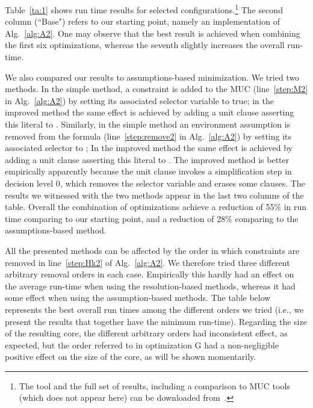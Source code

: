 \documentclass[twoside,11pt]{article}
\begin{document}
Table~\ref{ta:1} shows run time results for selected
configurations.\footnote{The tool and the full set of results, including a
comparison to MUC tools (which does not appear here) can be downloaded
from~\cite{RS11-URL}.} The second column (``Base") refers to our starting
point, namely an implementation of Alg.~\ref{alg:A2}. One may observe that the best result is achieved when combining the first six optimizations, whereas the seventh slightly increases the overall run-time.



We also compared our results to assumptions-based minimization. We tried two methods. In the simple
method, a constraint is added to the MUC (line~\ref{step:M2} in
Alg.~\ref{alg:A2}) by setting its associated selector variable to true; in
the improved method the same effect is achieved by adding a unit clause
asserting this literal to \true. Similarly, in the simple method an
environment assumption is removed from the formula (line~\ref{step:remove2}
in Alg.~\ref{alg:A2}) by setting its associated selector to \false; In the
improved method the same effect is achieved by adding a unit clause asserting
this literal to \false. The improved method is better empirically apparently
because the unit clause invokes a simplification step in decision level 0,
which removes the selector variable and erases some clauses. The results we
witnessed with the two methods appear in the last two columns of the table.
Overall the combination of optimizations achieve a reduction of 55\% in run
time comparing to our starting point, and a reduction of 28\% comparing to
the assumptions-based method.


All the presented methods can be affected by the order in which constraints
are removed in line~\ref{step:Hk2} of Alg.~\ref{alg:A2}. We therefore tried three different
arbitrary removal orders in each case. Empirically this hardly had an effect
on the average run-time when using the resolution-based methods, whereas it
had some effect when using the assumption-based methods. The table below
represents the best overall run times among the different orders we tried
(i.e., we present the results that together have the minimum run-time).
Regarding the size of the resulting core, the different arbitrary orders had
inconsistent effect, as expected, but the order referred to in optimization
G had a non-negligible positive effect on the size of the core, as will
be shown momentarily.
\end{document}
